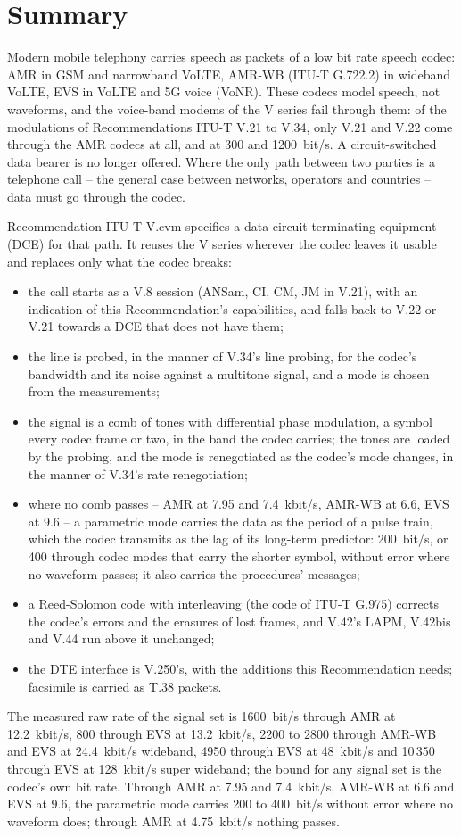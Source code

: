 \documentclass[a4paper,11pt]{article}
\newcommand{\recname}{V.cvm}
\newcommand{\kbs}{kbit/s}
\begin{document}
\section*{Summary}
Modern mobile telephony carries speech as packets of a low bit rate speech
codec: AMR in GSM and narrowband VoLTE, AMR-WB (ITU-T G.722.2) in wideband
VoLTE, EVS in VoLTE and 5G voice (VoNR).  These codecs model speech, not
waveforms, and the voice-band modems of the V series fail through them:
of the modulations of Recommendations ITU-T V.21 to V.34, only V.21 and
V.22 come through the AMR codecs at all, and at 300 and 1200~bit/s.  A
circuit-switched data bearer is no longer offered.  Where the only path
between two parties is a telephone call -- the general case between
networks, operators and countries -- data must go through the codec.

Recommendation ITU-T \recname{} specifies a data circuit-terminating
equipment (DCE) for that path.  It reuses the V series wherever the codec
leaves it usable and replaces only what the codec breaks:
\begin{itemize}
\item the call starts as a V.8 session (ANSam, CI, CM, JM in V.21), with
  an indication of this Recommendation's capabilities, and falls back to
  V.22 or V.21 towards a DCE that does not have them;
\item the line is probed, in the manner of V.34's line probing, for the
  codec's bandwidth and its noise against a multitone signal, and a
  mode is chosen from the measurements;
\item the signal is a comb of tones with differential phase modulation,
  a symbol every codec frame or two, in the band the codec carries; the
  tones are loaded by the probing, and the mode is renegotiated as the
  codec's mode changes, in the manner of V.34's rate renegotiation;
\item where no comb passes -- AMR at 7.95 and 7.4~\kbs{}, AMR-WB at
  6.6, EVS at 9.6 -- a parametric mode carries the data as the period of
  a pulse train, which the codec transmits as the lag of its long-term
  predictor: 200~bit/s, or 400 through codec modes that carry the shorter
  symbol, without error where no waveform passes; it also carries the
  procedures' messages;
\item a Reed-Solomon code with interleaving (the code of ITU-T G.975)
  corrects the codec's errors and the erasures of lost frames, and
  V.42's LAPM, V.42bis and V.44 run above it unchanged;
\item the DTE interface is V.250's, with the additions this
  Recommendation needs; facsimile is carried as T.38 packets.
\end{itemize}
The measured raw rate of the signal set is 1600~bit/s through AMR at
12.2~\kbs{}, 800 through EVS at 13.2~\kbs{}, 2200 to 2800 through
AMR-WB and EVS at 24.4~\kbs{} wideband, 4950 through EVS at 48~\kbs{}
and 10\,350 through EVS at 128~\kbs{} super wideband; the bound for any
signal set is the codec's own bit rate.  Through AMR at 7.95 and
7.4~\kbs{}, AMR-WB at 6.6 and EVS at 9.6, the parametric mode carries 200
to 400~bit/s without error where no waveform does; through AMR at
4.75~\kbs{} nothing passes.
\end{document}
